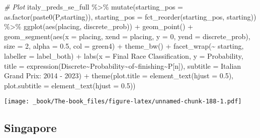 \documentclass[
]{book}
\newenvironment{Shaded}{\begin{snugshade}}{\end{snugshade}}
\newcommand{\AttributeTok}[1]{\textcolor[rgb]{0.77,0.63,0.00}{#1}}
\newcommand{\CommentTok}[1]{\textcolor[rgb]{0.56,0.35,0.01}{\textit{#1}}}
\newcommand{\DecValTok}[1]{\textcolor[rgb]{0.00,0.00,0.81}{#1}}
\newcommand{\FloatTok}[1]{\textcolor[rgb]{0.00,0.00,0.81}{#1}}
\newcommand{\FunctionTok}[1]{\textcolor[rgb]{0.00,0.00,0.00}{#1}}
\newcommand{\NormalTok}[1]{#1}
\newcommand{\SpecialCharTok}[1]{\textcolor[rgb]{0.00,0.00,0.00}{#1}}
\newcommand{\StringTok}[1]{\textcolor[rgb]{0.31,0.60,0.02}{#1}}
\begin{document}
\begin{Shaded}
\begin{Highlighting}[]
\CommentTok{\# Plot}
\NormalTok{italy\_preds\_se\_full }\SpecialCharTok{\%\textgreater{}\%}
  \FunctionTok{mutate}\NormalTok{(}\AttributeTok{starting\_pos =} \FunctionTok{as.factor}\NormalTok{(}\FunctionTok{paste0}\NormalTok{(}\StringTok{\textquotesingle{}P\textquotesingle{}}\NormalTok{,starting)),}
         \AttributeTok{starting\_pos =} \FunctionTok{fct\_reorder}\NormalTok{(starting\_pos, starting)) }\SpecialCharTok{\%\textgreater{}\%}
  \FunctionTok{ggplot}\NormalTok{(}\FunctionTok{aes}\NormalTok{(placing, discrete\_prob)) }\SpecialCharTok{+}
  \FunctionTok{geom\_point}\NormalTok{() }\SpecialCharTok{+}
  \FunctionTok{geom\_segment}\NormalTok{(}\FunctionTok{aes}\NormalTok{(}\AttributeTok{x =}\NormalTok{ placing, }\AttributeTok{xend =}\NormalTok{ placing, }\AttributeTok{y =} \DecValTok{0}\NormalTok{, }\AttributeTok{yend =}\NormalTok{ discrete\_prob),}
               \AttributeTok{size =} \DecValTok{2}\NormalTok{, }\AttributeTok{alpha =} \FloatTok{0.5}\NormalTok{, }\AttributeTok{col =} \StringTok{\textquotesingle{}green4\textquotesingle{}}\NormalTok{) }\SpecialCharTok{+}
  \FunctionTok{theme\_bw}\NormalTok{() }\SpecialCharTok{+}
  \FunctionTok{facet\_wrap}\NormalTok{(}\SpecialCharTok{\textasciitilde{}}\NormalTok{ starting, }\AttributeTok{labeller =}\NormalTok{ label\_both) }\SpecialCharTok{+}
  \FunctionTok{labs}\NormalTok{(}\AttributeTok{x =} \StringTok{\textquotesingle{}Final Race Classification\textquotesingle{}}\NormalTok{,}
       \AttributeTok{y =} \StringTok{\textquotesingle{}Probability\textquotesingle{}}\NormalTok{,}
       \AttributeTok{title =} \FunctionTok{expression}\NormalTok{(Discrete}\SpecialCharTok{\textasciitilde{}}\NormalTok{Probability}\SpecialCharTok{\textasciitilde{}}\NormalTok{of}\SpecialCharTok{\textasciitilde{}}\NormalTok{finishing}\SpecialCharTok{\textasciitilde{}}\NormalTok{P[n]),}
       \AttributeTok{subtitle =} \StringTok{\textquotesingle{}Italian Grand Prix: 2014 {-} 2023\textquotesingle{}}\NormalTok{) }\SpecialCharTok{+}
  \FunctionTok{theme}\NormalTok{(}\AttributeTok{plot.title =} \FunctionTok{element\_text}\NormalTok{(}\AttributeTok{hjust =} \FloatTok{0.5}\NormalTok{),}
        \AttributeTok{plot.subtitle =} \FunctionTok{element\_text}\NormalTok{(}\AttributeTok{hjust =} \FloatTok{0.5}\NormalTok{)) }
\end{Highlighting}
\end{Shaded}

\texttt{[image: \_book/The-book\_files/figure-latex/unnamed-chunk-188-1.pdf]}

\hypertarget{singapore}{%
\subsection{Singapore}\label{singapore}}
\end{document}
